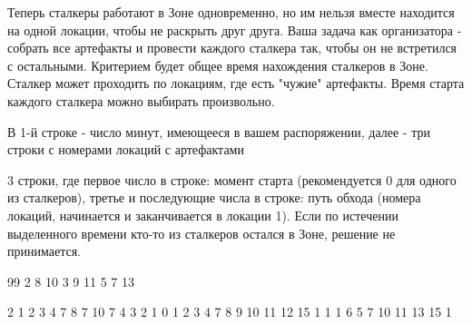 
Теперь сталкеры работают в Зоне одновременно, но им нельзя вместе находится на одной локации, чтобы не раскрыть друг друга. Ваша задача как организатора - собрать все артефакты и провести каждого сталкера так, чтобы он не встретился с остальными. Критерием будет общее время нахождения сталкеров в Зоне. Сталкер может проходить по локациям, где есть "чужие" артефакты. Время старта каждого сталкера можно выбирать произвольно.


В 1-й строке - число минут, имеющееся в вашем распоряжении, далее - три строки с номерами локаций с артефактами

\outputfmtSection

3 строки, где первое число в строке: момент старта (рекомендуется 0 для одного из сталкеров), третье и последующие числа в строке: путь обхода (номера локаций, начинается и заканчивается в локации 1). Если по истечении выделенного времени кто-то из сталкеров остался в Зоне, решение не принимается.

\begin{myverbbox}[\small]{\vinput}
    99
    2 8 10
    3 9 11
    5 7 13
\end{myverbbox}
\begin{myverbbox}[\small]{\voutput}
    2 1 2 3 4 7 8 7 10 7 4 3 2 1
    0 1 2 3 4 7 8 9 10 11 12 15 1
    1 1 6 5 7 10 11 13 15 1
\end{myverbbox}

